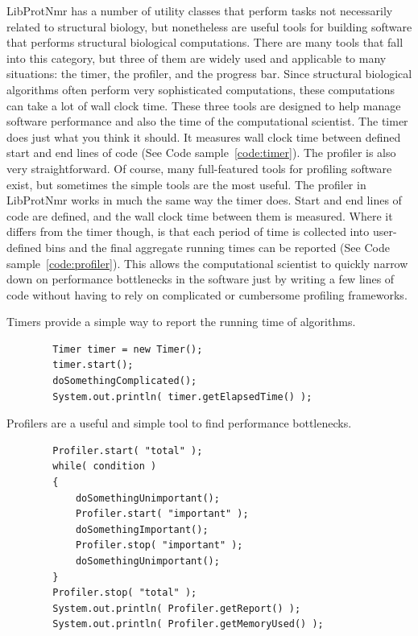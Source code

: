 \documentclass[11pt]{article}
\newcommand{\software}[1]{{\sc #1}}
\newcommand{\coderef}[1]{Code sample~\ref{#1}}
\newenvironment{codesample}
{
\begin{codesamplefloat}
\centering
\RecustomVerbatimEnvironment{Verbatim}{BVerbatim}{}
\vspace{0.1in}
}{
\end{codesamplefloat}
}
\newcommand{\libprotnmr}{\software{LibProtNmr}}
\begin{document}
{\libprotnmr} has a number of utility classes that perform tasks not necessarily related to structural biology, but nonetheless are useful tools for building software that performs structural biological computations. There are many tools that fall into this category, but three of them are widely used and applicable to many situations: the timer, the profiler, and the progress bar. Since structural biological algorithms often perform very sophisticated computations, these computations can take a lot of wall clock time. These three tools are designed to help manage software performance and also the time of the computational scientist. The timer does just what you think it should. It measures wall clock time between defined start and end lines of code (See \coderef{code:timer}). The profiler is also very straightforward. Of course, many full-featured tools for profiling software exist, but sometimes the simple tools are the most useful. The profiler in {\libprotnmr} works in much the same way the timer does. Start and end lines of code are defined, and the wall clock time between them is measured. Where it differs from the timer though, is that each period of time is collected into user-defined bins and the final aggregate running times can be reported (See \coderef{code:profiler}). This allows the computational scientist to quickly narrow down on performance bottlenecks in the software just by writing a few lines of code without having to rely on complicated or cumbersome profiling frameworks.

\begin{codesample}
	\caption{
		Timers provide a simple way to report the running time of algorithms.
	}
	\begin{verbatim}
		Timer timer = new Timer();
		timer.start();
		doSomethingComplicated();
		System.out.println( timer.getElapsedTime() );
	\end{verbatim}
	\label{code:timer}
\end{codesample}

\begin{codesample}
	\caption{
		Profilers are a useful and simple tool to find performance bottlenecks.
	}
	\begin{verbatim}
		Profiler.start( "total" );
		while( condition )
		{
			doSomethingUnimportant();
			Profiler.start( "important" );
			doSomethingImportant();
			Profiler.stop( "important" );
			doSomethingUnimportant();
		}
		Profiler.stop( "total" );
		System.out.println( Profiler.getReport() );
		System.out.println( Profiler.getMemoryUsed() );
	\end{verbatim}
	\label{code:profiler}
\end{codesample}
\end{document}
